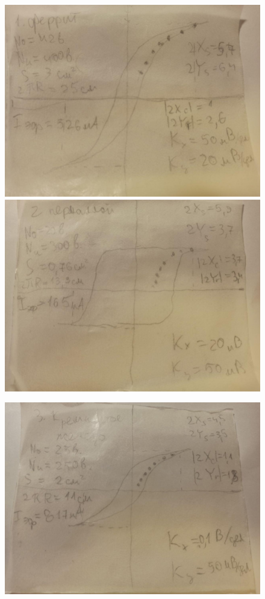 \documentclass[a4paper, 12pt]{article}
\begin{document}
\begin{figure}[!h]
    \includegraphics[scale = 0.15]{1}
    \includegraphics[scale = 0.15]{2}
    \centering
\end{figure}

\begin{figure}[!h]
    \includegraphics[scale = 0.15]{3}
    \centering
\end{figure}
\end{document}
